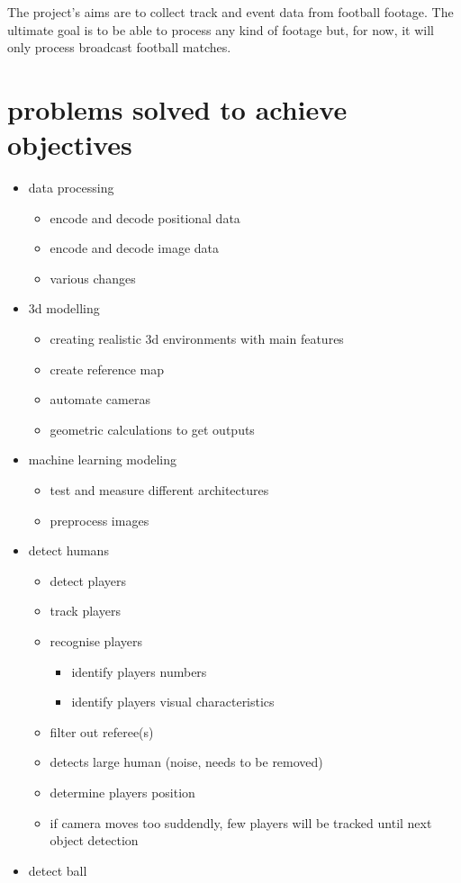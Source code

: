 \documentclass[
11pt,
twoside
]{report}
\begin{document}
The project's aims are to collect track and event data from football
footage. The ultimate goal is to be able to process any kind of footage
but, for now, it will only process broadcast football matches.



\section{problems solved to achieve objectives}

\begin{itemize}
\item
  data processing

  \begin{itemize}
  \item
    encode and decode positional data
  \item
    encode and decode image data
  \item
    various changes
  \end{itemize}
\item
  3d modelling

  \begin{itemize}
  \item
    creating realistic 3d environments with main features
  \item
    create reference map
  \item
    automate cameras
  \item
    geometric calculations to get outputs
  \end{itemize}
\item
  machine learning modeling

  \begin{itemize}
  \item
    test and measure different architectures
  \item
    preprocess images
  \end{itemize}
\item
  detect humans

  \begin{itemize}
  \item
    detect players
  \item
    track players
  \item
    recognise players

    \begin{itemize}
    \item
      identify players numbers
    \item
      identify players visual characteristics
    \end{itemize}
  \item
    filter out referee(s)
  \item
    detects large human (noise, needs to be removed)
  \item
    determine players position
  \item
    if camera moves too suddendly, few players will be tracked until
    next object detection
  \end{itemize}
\item
  detect ball


\end{itemize}
\end{document}
